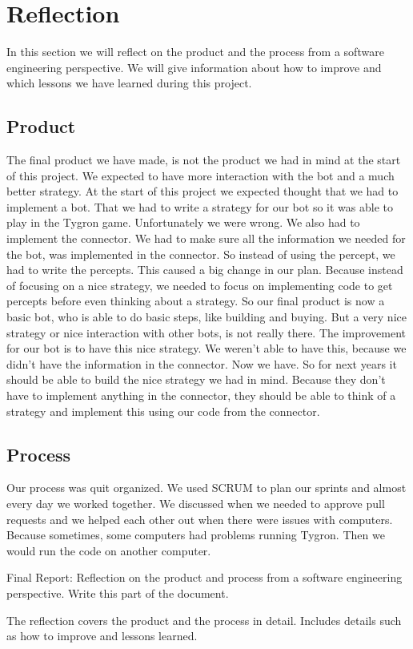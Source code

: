 \section{Reflection}
In this section we will reflect on the product and the process from a software engineering perspective. We will give information about how to improve and which lessons we have learned during this project.
\subsection{Product}
The final product we have made, is not the product we had in mind at the start of this project. We expected to have more interaction with the bot and a much better strategy. At the start of this project we expected thought that we had to implement a bot. That we had to write a strategy for our bot so it was able to play in the Tygron game. Unfortunately we were wrong. We also had to implement the connector. We had to make sure all the information we needed for the bot, was implemented in the connector. So instead of using the percept, we had to write the percepts. This caused a big change in our plan. Because instead of focusing on a nice strategy, we needed to focus on implementing code to get percepts before even thinking about a strategy. So our final product is now a basic bot, who is able to do basic steps, like building and buying. But a very nice strategy or nice interaction with other bots, is not really there. The improvement for our bot is to have this nice strategy. We weren't able to have this, because we didn't have the information in the connector. Now we have. So for next years it should be able to build the nice strategy we had in mind. Because they don't have to implement anything in the connector, they should be able to think of a strategy and implement this using our code from the connector.

\subsection{Process}
Our process was quit organized. We used SCRUM to plan our sprints and almost every day we worked together. We discussed when we needed to approve pull requests and we helped each other out when there were issues with computers. Because sometimes, some computers had problems running Tygron. Then we would run the code on another computer. 

Final Report: Reflection on the product and process from a software engineering perspective. Write this part of the document.

The reflection covers the product and the process in detail. Includes details such as how to improve and lessons learned.
\newpage
	
